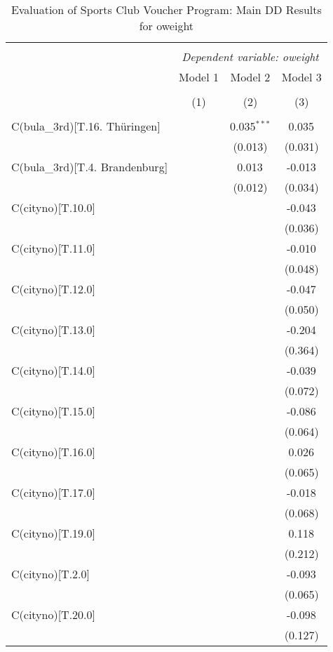 \begin{table}[!htbp] \centering
  \caption{Evaluation of Sports Club Voucher Program: Main DD Results for oweight}
\begin{tabular}{@{\extracolsep{5pt}}lccc}
\\[-1.8ex]\hline
\hline \\[-1.8ex]
& \multicolumn{3}{c}{\textit{Dependent variable: oweight}} \
\cr \cline{2-4}
\\[-1.8ex] & \multicolumn{1}{c}{Model 1} & \multicolumn{1}{c}{Model 2} & \multicolumn{1}{c}{Model 3}  \\
\\[-1.8ex] & (1) & (2) & (3) \\
\hline \\[-1.8ex]
 C(bula_3rd)[T.16. Thüringen] & & 0.035$^{***}$ & 0.035$^{}$ \\
& & (0.013) & (0.031) \\
 C(bula_3rd)[T.4. Brandenburg] & & 0.013$^{}$ & -0.013$^{}$ \\
& & (0.012) & (0.034) \\
 C(cityno)[T.10.0] & & & -0.043$^{}$ \\
& & & (0.036) \\
 C(cityno)[T.11.0] & & & -0.010$^{}$ \\
& & & (0.048) \\
 C(cityno)[T.12.0] & & & -0.047$^{}$ \\
& & & (0.050) \\
 C(cityno)[T.13.0] & & & -0.204$^{}$ \\
& & & (0.364) \\
 C(cityno)[T.14.0] & & & -0.039$^{}$ \\
& & & (0.072) \\
 C(cityno)[T.15.0] & & & -0.086$^{}$ \\
& & & (0.064) \\
 C(cityno)[T.16.0] & & & 0.026$^{}$ \\
& & & (0.065) \\
 C(cityno)[T.17.0] & & & -0.018$^{}$ \\
& & & (0.068) \\
 C(cityno)[T.19.0] & & & 0.118$^{}$ \\
& & & (0.212) \\
 C(cityno)[T.2.0] & & & -0.093$^{}$ \\
& & & (0.065) \\
 C(cityno)[T.20.0] & & & -0.098$^{}$ \\
& & & (0.127) \\

\end{tabular}
\end{table}
